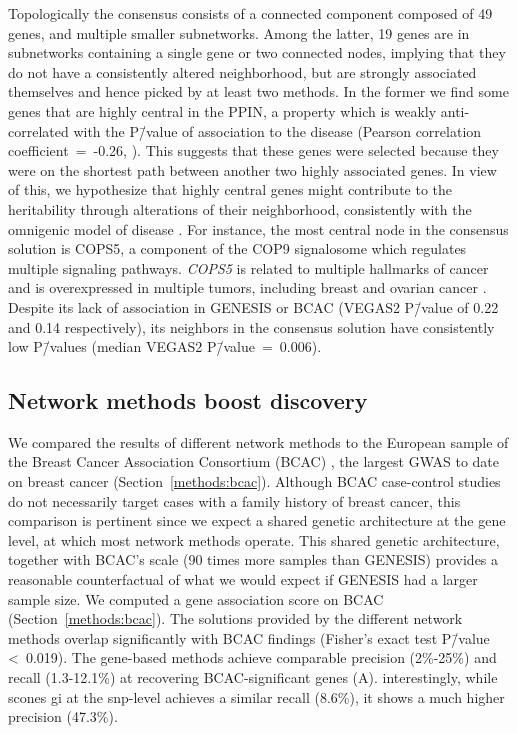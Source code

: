 \documentclass[10pt,letterpaper]{article}
\begin{document}
Topologically the consensus consists of a connected component composed of 49 genes, and multiple smaller subnetworks. Among the latter, 19 genes are in subnetworks containing a single gene or two connected nodes, implying that they do not have a consistently altered neighborhood, but are strongly associated themselves and hence picked by at least two methods. In the former we find some genes that are highly central in the PPIN, a property which is weakly anti-correlated with the P\=/value of association to the disease (Pearson correlation coefficient~=~-0.26, ). This suggests that these genes were selected because they were on the shortest path between another two highly associated genes. In view of this, we hypothesize that highly central genes might contribute to the heritability through alterations of their neighborhood, consistently with the omnigenic model of disease \cite{boyle_expanded_2017}. For instance, the most central node in the consensus solution is COPS5, a component of the COP9 signalosome which regulates multiple signaling pathways. \emph{COPS5} is related to multiple hallmarks of cancer and is overexpressed in multiple tumors, including breast and ovarian cancer \cite{liu_jab1_cops5_2018}. Despite its lack of association in GENESIS or BCAC (VEGAS2 P\=/value of 0.22 and 0.14 respectively), its neighbors in the consensus solution have consistently low P\=/values (median VEGAS2 P\=/value~=~0.006).

\subsection{Network methods boost discovery}
\label{results:boost}

We compared the results of different network methods to the European sample of the Breast Cancer Association Consortium (BCAC) \cite{Michailidou2017}, the largest GWAS to date on breast cancer (Section~\ref{methods:bcac}). Although BCAC case-control studies do not necessarily target cases with a family history of breast cancer, this comparison is pertinent since we expect a shared genetic architecture at the gene level, at which most network methods operate. This shared genetic architecture, together with BCAC's scale (90 times more samples than GENESIS) provides a reasonable counterfactual of what we would expect if GENESIS had a larger sample size. We computed a gene association score on BCAC (Section~\ref{methods:bcac}). The solutions provided by the different  network methods overlap significantly with BCAC findings (Fisher's exact test P\=/value \textless~0.019). The gene-based methods achieve comparable precision (2\%-25\%) and recall (1.3-12.1\%) at recovering BCAC-significant genes (A). interestingly, while scones gi at the snp-level achieves a similar recall (8.6\%), it shows a much higher precision (47.3\%).
\end{document}
